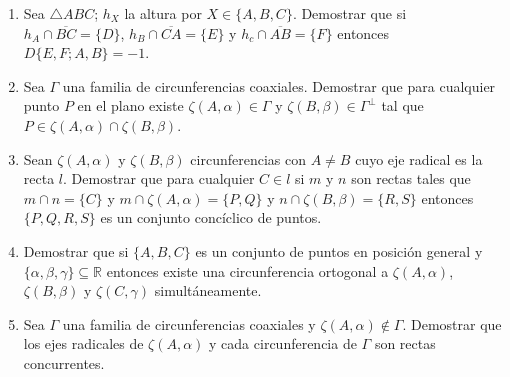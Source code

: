 \documentclass[12pt]{report}
\newcommand{\R}{\mathbb R}
\begin{document}
\begin{enumerate}


\item Sea $\triangle ABC$; $h_X$ la altura por $X \in \{A,B,C\}$. Demostrar que si $h_A \cap \overline{BC}=\{D\}$, $h_B \cap \overline{CA}=\{E\}$ y $h_c \cap \overline{AB}=\{F\}$ entonces $D\{E,F;A,B\} = -1$.


\item Sea $\Gamma$ una familia de circunferencias coaxiales. Demostrar que para cualquier punto $P$ en el plano existe $\zeta(A, \alpha) \in \Gamma$ y $\zeta(B,\beta) \in \Gamma^\bot$ tal que $P \in \zeta(A, \alpha) \cap \zeta(B,\beta)$.
 

\item Sean $\zeta(A,\alpha)$ y $\zeta(B,\beta)$ circunferencias con $A \neq B$ cuyo eje radical es la recta $l$. Demostrar que para cualquier $C \in l$ si $m$ y $n$ son rectas tales que $m \cap n = \{C\}$ y $m \cap \zeta(A, \alpha) = \{P,Q\}$ y $n \cap \zeta(B, \beta) = \{R,S\}$ entonces $\{P,Q,R,S\}$ es un conjunto concíclico de puntos.

\item Demostrar que si $\{A,B,C\}$ es un conjunto de puntos en posición general y $\{\alpha, \beta,\gamma\} \subseteq \R$ entonces existe una circunferencia ortogonal a $\zeta(A,\alpha)$, $\zeta(B,\beta)$ y $\zeta(C,\gamma)$ simultáneamente.

\item Sea $\Gamma$ una familia de circunferencias coaxiales y $\zeta(A, \alpha) \notin \Gamma$. Demostrar que los ejes radicales de $\zeta (A, \alpha)$ y cada circunferencia de $\Gamma$ son rectas concurrentes.



\end{enumerate}
\end{document}
